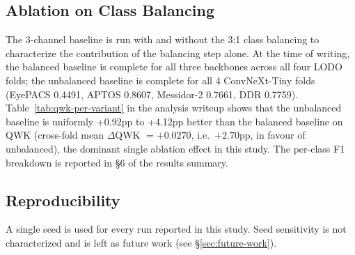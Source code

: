 \documentclass[11pt]{article}
\begin{document}
\subsection{Ablation on Class Balancing}
\label{sec:abl-balancing}
The 3-channel baseline is run with and without the 3:1 class balancing to characterize the contribution of the balancing step alone. At the time of writing, the balanced baseline is complete for all three backbones across all four LODO folds; the unbalanced baseline is complete for all 4 ConvNeXt-Tiny folds (EyePACS 0.4491, APTOS 0.8607, Messidor-2 0.7661, DDR 0.7759). Table~\ref{tab:qwk-per-variant} in the analysis writeup shows that the unbalanced baseline is uniformly +0.92pp to +4.12pp better than the balanced baseline on QWK (cross-fold mean $\Delta$QWK $= +0.0270$, i.e.\ $+2.70$pp, in favour of unbalanced), the dominant single ablation effect in this study. The per-class F1 breakdown is reported in \S6 of the results summary.

\subsection{Reproducibility}
A single seed is used for every run reported in this study. Seed sensitivity is not characterized and is left as future work (see \S\ref{sec:future-work}).
\end{document}
